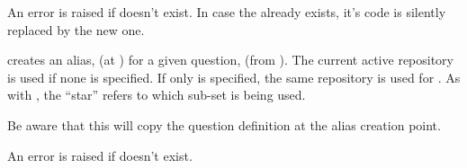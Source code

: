 \documentclass[10pt]{article}
\begin{document}
\begin{tsremark}
An error is raised if  doesn't exist. In case the  already exists, it's code is silently replaced by the new one.
\end{tsremark}


\begin{codedescribe}[code,update={2025-04-25}]{}
\begin{codesyntax}%
\end{codesyntax}
 creates an alias,  (at ) for a given question,  (from ). The current active repository is used if none is specified. If only  is specified, the same repository is used for . As with , the ``star'' refers to which sub-set is being used.
\end{codedescribe}


\begin{tsremark}
Be aware that this will copy the question definition at the alias creation point.
\end{tsremark}

\begin{tsremark}
An error is raised if  doesn't exist.
\end{tsremark}
\end{document}
